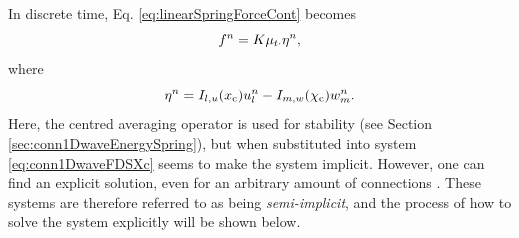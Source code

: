 
In discrete time, Eq. \eqref{eq:linearSpringForceCont} becomes
\begin{equation}\label{eq:linearSpringForceDisc}
    f^n = K\mu_{t\cdot}\eta^n,
\end{equation}
where
\begin{equation}\label{eq:discEtaConn1Dwave}
    \eta^n = I_{l, u}(x_{\text{c}})u_l^n - I_{m, w}(\chi_{\text{c}})w_m^n.
\end{equation}
Here, the centred averaging operator is used for stability (see Section \ref{sec:conn1DwaveEnergySpring}), but when substituted into system \eqref{eq:conn1DwaveFDSXc} seems to make the system implicit. However, one can find an explicit solution, even for an arbitrary amount of connections \cite{Bilbao2009Modular}. These systems are therefore referred to as being \textit{semi-implicit}, and the process of how to solve the system explicitly will be shown below.

